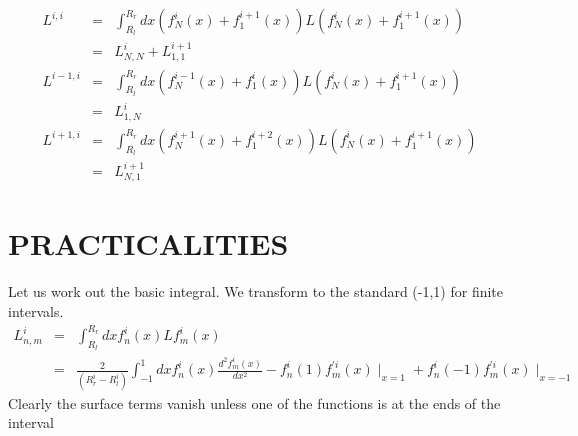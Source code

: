 \begin{eqnarray}
    L^{i,i} &=& \int_{R_{l}}^{R_{r}} dx ( f^{i}_{N}(x) + f^{i+1}_{1}(x) ) L 
                      ( f^{i}_{N}(x) + f^{i+1}_{1}(x) ) \\ \nonumber
            &=& L^{i}_{N,N} + L^{i+1}_{1,1} \\ \nonumber
    L^{i-1,i} &=& \int_{R_{l}}^{R_{r}} dx ( f^{i-1}_{N}(x) + f^{i}_{1}(x) ) L 
                      ( f^{i}_{N}(x) + f^{i+1}_{1}(x) ) \\ \nonumber
            &=& L^{i}_{1,N} \\ \nonumber
    L^{i+1,i} &=& \int_{R_{l}}^{R_{r}} dx ( f^{i+1}_{N}(x) + f^{i+2}_{1}(x) )
                    L ( f^{i}_{N}(x) + f^{i+1}_{1}(x) ) \\ \nonumber
            &=& L^{i+1}_{N,1} 
\end{eqnarray}

\section{PRACTICALITIES}
Let us work out the basic integral.  We transform to the standard (-1,1) for
finite intervals.
\begin{eqnarray}
   L^{i}_{n,m} &=& \int_{R_{l}}^{R_{r}} dx f^{i}_{n}(x) L f^{i}_{m}(x) 
                                   \\ \nonumber
                &=& \frac{2}{(R^{i}_{r} - R^{i}_{l})} \int_{-1}^{1} dx
                   f^{i}_{n}(x) \frac{d^2 f^{i}_{m}(x)}{dx^2}
                  - f^{i}_{n}(1) f^{\prime i}_{m}(x) \mid_{x=1}  
                  + f^{i}_{n}(-1) f^{\prime i}_{m}(x) \mid_{x=-1}  
\end{eqnarray}
Clearly the surface terms vanish unless one of the functions is at the ends
of the interval



